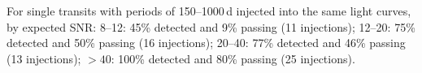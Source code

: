 For single transits with periods of 150--1000\,d injected into the same light curves, by expected SNR: 8--12: 45\% detected and 9\% passing (11 injections); 12--20: 75\% detected and 50\% passing (16 injections); 20--40: 77\% detected and 46\% passing (13 injections); $>40$: 100\% detected and 80\% passing (25 injections).
